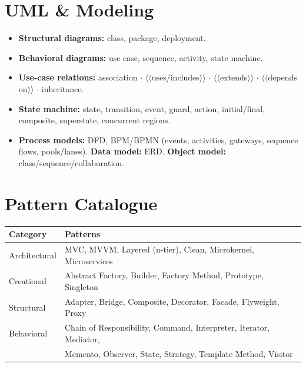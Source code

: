 \documentclass[hidelinks]{article}
\begin{document}
\section{UML \& Modeling}
\begin{itemize}
  \item \textbf{Structural diagrams:} class, package, deployment.
  \item \textbf{Behavioral diagrams:} use case, sequence, activity, state machine.
  \item \textbf{Use-case relations:} association $\cdot$ $\langle\langle$uses/includes$\rangle\rangle$
        $\cdot$ $\langle\langle$extends$\rangle\rangle$ $\cdot$ $\langle\langle$depends on$\rangle\rangle$
        $\cdot$ inheritance.
  \item \textbf{State machine:} state, transition, event, guard, action, initial/final, composite,
        superstate, concurrent regions.
  \item \textbf{Process models:} DFD, BPM/BPMN (events, activities, gateways, sequence flows,
        pools/lanes). \textbf{Data model:} ERD. \textbf{Object model:} class/sequence/collaboration.
\end{itemize}

\section{Pattern Catalogue}
\renewcommand{\arraystretch}{1.25}
\noindent\begin{tabular}{|l|l|}
\hline
\textbf{\color{capri}Category} & \textbf{\color{capri}Patterns} \\
\hline
Architectural & MVC, MVVM, Layered (n-tier), Clean, Microkernel, Microservices \\ \hline
Creational    & Abstract Factory, Builder, Factory Method, Prototype, Singleton \\ \hline
Structural    & Adapter, Bridge, Composite, Decorator, Facade, Flyweight, Proxy \\ \hline
Behavioral    & Chain of Responsibility, Command, Interpreter, Iterator, Mediator, \\
              & Memento, Observer, State, Strategy, Template Method, Visitor \\ \hline
\end{tabular}
\end{document}

